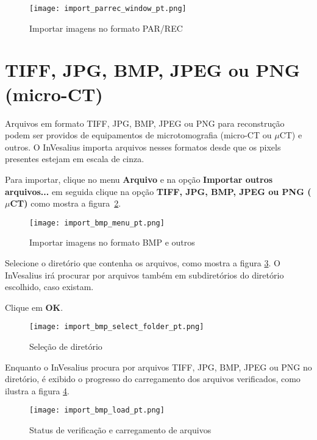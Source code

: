 \begin{figure}[!htb]
\centering
\texttt{[image: import\_parrec\_window\_pt.png]}
\caption{Importar imagens no formato PAR/REC}
\label{fig:import_parrec_window_pt}
\end{figure}



\section{TIFF, JPG, BMP, JPEG ou PNG (micro-CT)}

Arquivos em formato TIFF, JPG, BMP, JPEG ou PNG para reconstrução podem ser providos de equipamentos de microtomografia (micro-CT ou $\mu$CT) e outros. O InVesalius importa arquivos nesses formatos desde que os pixels presentes estejam em escala de cinza.

Para importar, clique no menu \textbf{Arquivo} e na opção \textbf{Importar outros arquivos...} em seguida clique na opção \textbf{TIFF, JPG, BMP, JPEG ou PNG ($\mu$CT)} como mostra a figura~\ref{fig:import_bmp_menu_pt}. 

\begin{figure}[!htb]
\centering
\texttt{[image: import\_bmp\_menu\_pt.png]}
\caption{Importar imagens no formato BMP e outros}
\label{fig:import_bmp_menu_pt}
\end{figure}

Selecione o diretório que contenha os arquivos, como mostra a figura \ref{fig:import_bmp_select_folder}. O InVesalius irá procurar por arquivos também em subdiretórios do diretório escolhido, caso existam.

Clique em \textbf{OK}.

\begin{figure}[!htb]
\centering
\texttt{[image: import\_bmp\_select\_folder\_pt.png]}
\caption{Seleção de diretório}
\label{fig:import_bmp_select_folder}
\end{figure}


Enquanto o InVesalius procura por arquivos TIFF, JPG, BMP, JPEG ou PNG no diretório, é exibido o progresso do carregamento dos arquivos verificados, como ilustra a figura \ref{fig:import_bmp_load_pt}.

\begin{figure}[!htb]
\centering
\texttt{[image: import\_bmp\_load\_pt.png]}
\caption{Status de verificação e carregamento de arquivos}
\label{fig:import_bmp_load_pt}
\end{figure}


